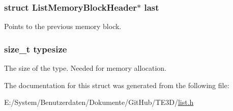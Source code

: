 \hypertarget{struct_list_a512a4382e503046b144aef2735fe7f9d}{
\subsubsection[{last}]{\setlength{\rightskip}{0pt plus 5cm}struct {\bf List\-Memory\-Block\-Header}$\ast$ last}}\label{struct_list_a512a4382e503046b144aef2735fe7f9d}


Points to the previous memory block. 

\hypertarget{struct_list_aae15b6d77b58dbd6f21861d1320ec961}{
\subsubsection[{typesize}]{\setlength{\rightskip}{0pt plus 5cm}size\-\_\-t typesize}}\label{struct_list_aae15b6d77b58dbd6f21861d1320ec961}


The size of the type. Needed for memory allocation. 



The documentation for this struct was generated from the following file\-:\begin{DoxyCompactItemize}
\item 
E\-:/\-System/\-Benutzerdaten/\-Dokumente/\-Git\-Hub/\-T\-E3\-D/\hyperlink{list_8h}{list.\-h}\end{DoxyCompactItemize}
